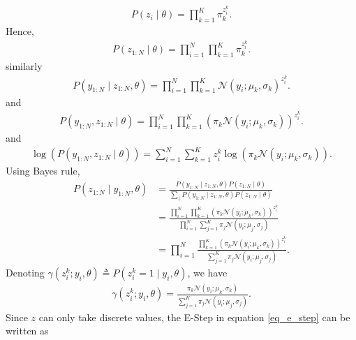 \documentclass[10pt ]{article}
\begin{document}
\begin{align}
P(z_i \mid \theta) = \prod_{k=1}^K \pi_k^{z^k_i }.
\end{align}
Hence, 
\begin{align}
P(z_{1:N} \mid \theta) = \prod_{i=1}^N  \prod_{k=1}^K \pi_k^{z^k_i }.
\end{align}
similarly
\begin{align}
P(y_{1:N} \mid z_{1:N}, \theta ) = \prod_{i=1}^N  \prod_{k=1}^K \mathcal{N}(y_{i} ; \mu_k, \sigma_k)^{z^k_i}.
\end{align}
and 
\begin{align}
P(y_{1:N} , z_{1:N} \mid \theta ) = \prod_{i=1}^N  \prod_{k=1}^K (\pi_k \mathcal{N}(y_{i} ; \mu_k, \sigma_k))^{z^k_i}.
\end{align}
and 
\begin{align}
\log \left( P(y_{1:N} , z_{1:N} \mid \theta ) \right)= \sum_{i=1}^N  \sum_{k=1}^K z^k_i \log \left( \pi_k \mathcal{N}(y_{i} ; \mu_k, \sigma_k) \right).
\end{align}
Using Bayes rule, 
\begin{align}
P(z_{1:N} \mid y_{1:N}, \theta ) &= \frac{P(y_{1:N} \mid z_{1:N}, \theta ) P(z_{1:N} \mid \theta)}{\sum_z P(y_{1:N} \mid z_{1:N}, \theta ) P(z_{1:N} \mid \theta)}  \nonumber \\
&= \frac{\prod_{i=1}^N \prod_{k=1}^K ( \pi_k\mathcal{N}(y_i ; \mu_k, \sigma_k))^{z^k_i }}{\prod_{i=1}^N \sum_{j=1}^K \pi_j \mathcal{N}(y_i ; \mu_j, \sigma_j) } \nonumber \\
&=\prod_{i=1}^N   \frac{\prod_{k=1}^K ( \pi_k\mathcal{N}(y_i ; \mu_k, \sigma_k))^{z^k_i }}{\sum_{j=1}^K \pi_j \mathcal{N}(y_i ; \mu_j, \sigma_j) }.
\end{align}
Denoting $\gamma(z^k_i; y_i, \theta) \triangleq P(z^k_i = 1\mid y_i, \theta ) $, we have
\begin{align}
\gamma(z^k_i; y_i, \theta )  =   \frac{  \pi_k\mathcal{N}(y_i ; \mu_k, \sigma_k) }{\sum_{j=1}^K \pi_j \mathcal{N}(y_i ; \mu_j, \sigma_j) }.
\label{eq_gamma}
\end{align}
Since $z$ can only take discrete values, the E-Step in equation \eqref{eq_e_step} can be written as 
\end{document}
